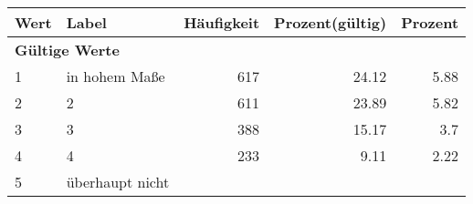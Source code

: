      \begin{longtable}{lXrrr}
     \toprule
     \textbf{Wert} & \textbf{Label} & \textbf{Häufigkeit} & \textbf{Prozent(gültig)} & \textbf{Prozent} \\
     \endhead
     \midrule
     \multicolumn{5}{l}{\textbf{Gültige Werte}}\\

     1 &
     \multicolumn{1}{X}{ in hohem Maße   } &


       \num{617} &
       \num[round-mode=places,round-precision=2]{24,12} &
         \num[round-mode=places,round-precision=2]{5,88} \\

     2 &
     \multicolumn{1}{X}{ 2   } &


       \num{611} &
       \num[round-mode=places,round-precision=2]{23,89} &
         \num[round-mode=places,round-precision=2]{5,82} \\

     3 &
     \multicolumn{1}{X}{ 3   } &


       \num{388} &
       \num[round-mode=places,round-precision=2]{15,17} &
         \num[round-mode=places,round-precision=2]{3,7} \\

     4 &
     \multicolumn{1}{X}{ 4   } &


       \num{233} &
       \num[round-mode=places,round-precision=2]{9,11} &
         \num[round-mode=places,round-precision=2]{2,22} \\

     5 &
     \multicolumn{1}{X}{ überhaupt nicht   } &



\end{longtable}
